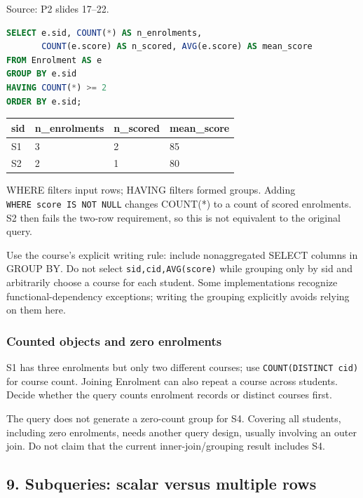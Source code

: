Source: P2 slides 17--22.

\Needspace{120pt}
\begin{lstlisting}[language=SQL]
SELECT e.sid, COUNT(*) AS n_enrolments,
       COUNT(e.score) AS n_scored, AVG(e.score) AS mean_score
FROM Enrolment AS e
GROUP BY e.sid
HAVING COUNT(*) >= 2
ORDER BY e.sid;
\end{lstlisting}

\begin{longtable}[]{@{}llll@{}}
\toprule\noalign{}
sid & n\_enrolments & n\_scored & mean\_score \\
\midrule\noalign{}
\endhead
\bottomrule\noalign{}
\endlastfoot
S1 & 3 & 2 & 85 \\
S2 & 2 & 1 & 80 \\
\end{longtable}

WHERE filters input rows; HAVING filters formed groups. Adding \texttt{WHERE\ score\ IS\ NOT\ NULL} changes COUNT(*) to a count of scored enrolments. S2 then fails the two-row requirement, so this is not equivalent to the original query.

Use the course's explicit writing rule: include nonaggregated SELECT columns in GROUP BY. Do not select \texttt{sid,\allowbreak{}cid,\allowbreak{}AVG(\allowbreak{}score)\allowbreak{}} while grouping only by sid and arbitrarily choose a course for each student. Some implementations recognize functional-dependency exceptions; writing the grouping explicitly avoids relying on them here.

\subsubsection{Counted objects and zero enrolments}\label{06_sql_queries_en-counted-objects-and-zero-enrolments}

S1 has three enrolments but only two different courses; use \texttt{COUNT(\allowbreak{}DISTINCT\ cid)\allowbreak{}} for course count. Joining Enrolment can also repeat a course across students. Decide whether the query counts enrolment records or distinct courses first.

The query does not generate a zero-count group for S4. Covering all students, including zero enrolments, needs another query design, usually involving an outer join. Do not claim that the current inner-join/grouping result includes S4.

\subsection{9. Subqueries: scalar versus multiple rows}\label{06_sql_queries_en-subqueries-scalar-versus-multiple-rows}

